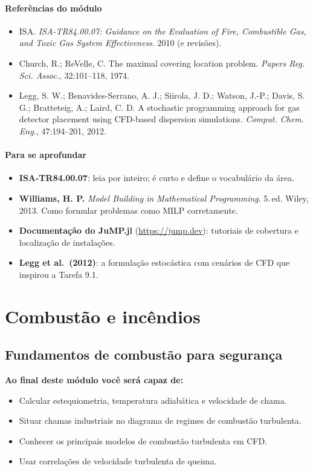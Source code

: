 \documentclass[10pt,a4paper,twocolumn,openany]{report}
\newenvironment{refs}{\subsection*{Referências do módulo}\small}{\par}
\newenvironment{aprofundar}{\subsection*{\textcolor{amarelo}{Para se aprofundar}}\small}{\par}
\newcommand{\objetivos}{\noindent\textbf{Ao final deste módulo você será capaz de:}}
\begin{document}
\begin{refs}
\begin{itemize}
  \item ISA. \emph{ISA-TR84.00.07: Guidance on the Evaluation of Fire, Combustible Gas, and Toxic Gas System Effectiveness}. 2010 (e revisões).
  \item Church, R.; ReVelle, C. The maximal covering location problem. \emph{Papers Reg. Sci. Assoc.}, 32:101--118, 1974.
  \item Legg, S. W.; Benavides-Serrano, A. J.; Siirola, J. D.; Watson, J.-P.; Davis, S. G.; Bratteteig, A.; Laird, C. D. A stochastic programming approach for gas detector placement using CFD-based dispersion simulations. \emph{Comput. Chem. Eng.}, 47:194--201, 2012.
\end{itemize}
\end{refs}

\begin{aprofundar}
\begin{itemize}[leftmargin=*]
  \item \textbf{ISA-TR84.00.07}: leia por inteiro; é curto e define o vocabulário da área.
  \item \textbf{Williams, H. P.} \emph{Model Building in Mathematical Programming}. 5.\,ed. Wiley, 2013. Como formular problemas como MILP corretamente.
  \item \textbf{Documentação do JuMP.jl} (\url{https://jump.dev}): tutoriais de cobertura e localização de instalações.
  \item \textbf{Legg et al.\ (2012)}: a formulação estocástica com cenários de CFD que inspirou a Tarefa 9.1.
\end{itemize}
\end{aprofundar}

\part{Combustão e incêndios}

\chapter{Fundamentos de combustão para segurança}

\objetivos
\begin{itemize}
  \item Calcular estequiometria, temperatura adiabática e velocidade de chama.
  \item Situar chamas industriais no diagrama de regimes de combustão turbulenta.
  \item Conhecer os principais modelos de combustão turbulenta em CFD.
  \item Usar correlações de velocidade turbulenta de queima.
\end{itemize}
\end{document}
